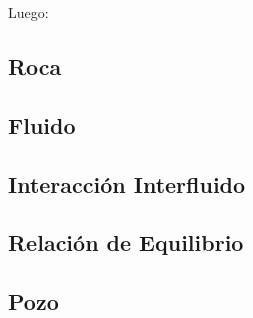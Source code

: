 Luego: 

\subsection{Roca}


\subsection{Fluido}
%
\subsection{Interacción Interfluido}
%
%
\subsection{Relación de Equilibrio}
%
\subsection{Pozo}

